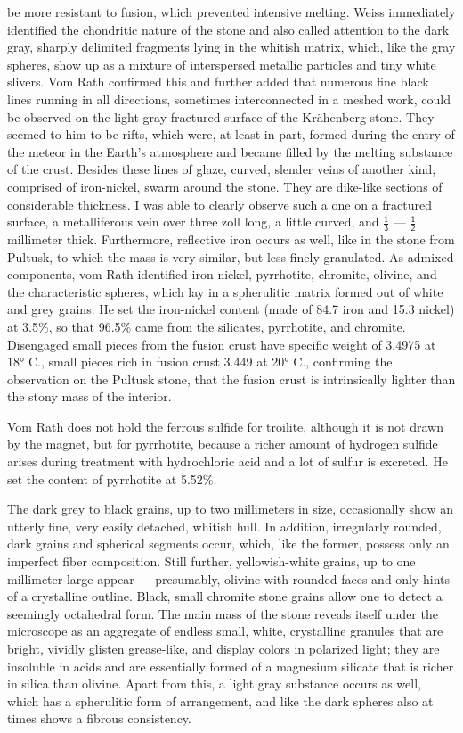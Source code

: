 \documentclass[a4paper, 12pt, oneside]{article}
\begin{document}
be more resistant to fusion, which prevented intensive melting. Weiss immediately identified the chondritic nature of the stone and also called attention to the dark gray, sharply delimited fragments lying in the whitish matrix, which, like the gray spheres, show up as a mixture of interspersed metallic particles and tiny white slivers. Vom Rath confirmed this and further added that numerous fine black lines running in all directions, sometimes interconnected in a meshed work, could be observed on the light gray fractured surface of the Krähenberg stone. They seemed to him to be rifts, which were, at least in part, formed during the entry of the meteor in the Earth's atmosphere and became filled by the melting substance of the crust. Besides these lines of glaze, curved, slender veins of another kind, comprised of iron-nickel, swarm around the stone. They are dike-like sections of considerable thickness. I was able to clearly observe such a one on a fractured surface, a metalliferous vein over three zoll long, a little curved, and $\mathsf{\frac{1}{3}}$ --- $\mathsf{\frac{1}{2}}$ millimeter thick. Furthermore, reflective iron occurs as well, like in the stone from Pultusk, to which the mass is very similar, but less finely granulated. As admixed components, vom Rath identified iron-nickel, pyrrhotite, chromite, olivine, and the characteristic spheres, which lay in a spherulitic matrix formed out of white and grey grains. He set the iron-nickel content (made of 84.7 iron and 15.3 nickel) at 3.5\%, so that 96.5\% came from the silicates, pyrrhotite, and chromite. Disengaged small pieces from the fusion crust have specific weight of 3.4975 at 18° C., small pieces rich in fusion crust 3.449 at 20° C., confirming the observation on the Pultusk stone, that the fusion crust is intrinsically lighter than the stony mass of the interior.

Vom Rath does not hold the ferrous sulfide for troilite, although it is not drawn by the magnet, but for pyrrhotite, because a richer amount of hydrogen sulfide arises during treatment with hydrochloric acid and a lot of sulfur is excreted. He set the content of pyrrhotite at 5.52\%.

The dark grey to black grains, up to two millimeters in size, occasionally show an utterly fine, very easily detached, whitish hull. In addition, irregularly rounded, dark grains and spherical segments occur, which, like the former, possess only an imperfect fiber composition. Still further, yellowish-white grains, up to one millimeter large appear --- presumably, olivine with rounded faces and only hints of a crystalline outline. Black, small chromite stone grains allow one to detect a seemingly octahedral form. The main mass of the stone reveals itself under the microscope as an aggregate of endless small, white, crystalline granules that are bright, vividly glisten grease-like, and display colors in polarized light; they are insoluble in acids and are essentially formed of a magnesium silicate that is richer in silica than olivine. Apart from this, a light gray substance occurs as well, which has a spherulitic form of arrangement, and like the dark spheres also at times shows a fibrous consistency.
\end{document}
